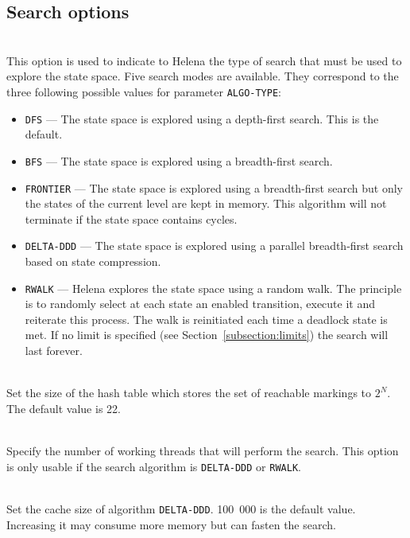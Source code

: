 \subsection{Search options}
\begin{description}
\item{}\\ This option is used
  to indicate to Helena the type of search that must be used to
  explore the state space. Five search modes are available. They
  correspond to the three following possible values for parameter
  \texttt{ALGO-TYPE}:
\begin{itemize}
\item\texttt{DFS} --- The state space is explored using a depth-first
  search.  This is the default.
\item\texttt{BFS} --- The state space is explored using a
  breadth-first search.
\item\texttt{FRONTIER} --- The state space is explored using a
  breadth-first search but only the states of the current level are
  kept in memory.  This algorithm will not terminate if the state
  space contains cycles.
\item\texttt{DELTA-DDD} --- The state space is explored using a
  parallel breadth-first search based on state compression.
\item\texttt{RWALK} --- Helena explores the state space using a
  random walk.  The principle is to randomly select at each state an
  enabled transition, execute it and reiterate this process.  The walk
  is reinitiated each time a deadlock state is met.  If no limit is
  specified (see Section~\ref{subsection:limits}) the search will last
  forever.
\end{itemize}
\item{}\\ Set the size of the hash table
  which stores the set of reachable markings to $2^N$.  The default
  value is 22.
\item{}\\ Specify the number of working
  threads that will perform the search.  This option is only usable if
  the search algorithm is \texttt{DELTA-DDD} or \texttt{RWALK}.
\item{}\\ Set the cache size of
  algorithm \texttt{DELTA-DDD}.  100~000 is the default value.
  Increasing it may consume more memory but can fasten the search.
\end{description}


